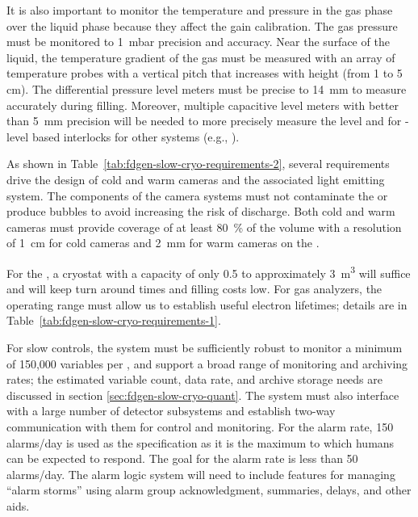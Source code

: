 It is also important to monitor the temperature and pressure in the gas phase over the liquid phase because they affect the  gain calibration. The gas pressure must be monitored to 1~mbar precision and accuracy. Near the surface of the liquid, the temperature gradient of the gas must be measured with an array of temperature probes with a vertical pitch that increases with height (from 1 to 5 cm). The  differential pressure level meters must be precise to \SI{14}{mm} to measure accurately during filling. 
Moreover, multiple capacitive level meters with better than 5~mm precision will be needed to more precisely measure the \lar level and for \lar-level based interlocks for other systems (e.g., ).  

As shown in Table~\ref{tab:fdgen-slow-cryo-requirements-2}, several requirements drive the design of cold and warm cameras and the associated light emitting system. The components of the camera systems must not contaminate the \lar or produce bubbles %
to avoid  increasing the risk of  discharge. Both cold and warm cameras must provide coverage of at least \SI{80}{\%} of the  volume 
with a resolution of \SI{1}{cm} for cold cameras and \SI{2}{mm} for warm cameras on the .

For the , a cryostat with a capacity of only \num{0.5} to approximately \SI{3}{m^3} %
will suffice and will keep turn around times and filling costs %
low. %
For gas analyzers, the operating range must allow us to establish useful electron lifetimes;
details  are in Table~\ref{tab:fdgen-slow-cryo-requirements-1}.

For slow controls, the system must
be sufficiently robust to monitor 
a minimum of 150,000 variables per , and 
support a broad range of monitoring and archiving rates;
the estimated variable count, data rate, and archive storage needs
are discussed in section \ref{sec:fdgen-slow-cryo-quant}.
The system must also
interface with a large number of detector subsystems and
establish two-way communication with them for control and monitoring. 
For the alarm rate, 150 alarms/day is used as the specification as it is the maximum to which humans can be expected to respond. The goal for the alarm rate is less than 50 alarms/day. The alarm logic system will need to include features for managing ``alarm storms'' using alarm group acknowledgment, summaries, delays, and other aids.


